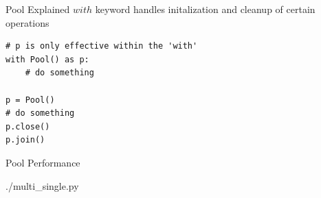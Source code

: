 \documentclass{beamer}
\begin{document}
\begin{frame}[fragile]{Pool Explained}
 $with$ keyword handles initalization and cleanup of certain operations
\begin{lstlisting}
# p is only effective within the 'with'
with Pool() as p:
    # do something

p = Pool()
# do something
p.close()
p.join()
\end{lstlisting}
\end{frame}

\begin{frame}{Pool Performance}
  \begin{lstinputlisting}
    {./multi_single.py}
  \end{lstinputlisting}
\end{frame}
\end{document}
